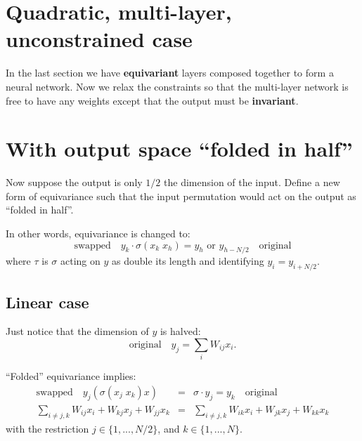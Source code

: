 \section{Quadratic, multi-layer, unconstrained case}

In the last section we have \textbf{equivariant} layers composed together to form a neural network.  Now we relax the constraints so that the multi-layer network is free to have any weights except that the output must be \textbf{invariant}.


\section{With output space ``folded in half''}

Now suppose the output is only $1/2$ the dimension of the input.  Define a new form of equivariance such that the input permutation would act on the output as ``folded in half''. 

In other words, equivariance is changed to:
\begin{equation}
\boxed{\mbox{swapped}} \quad y_k \cdot \sigma(x_k \; x_h) = y_h \mbox{  or  } y_{h-N/2} \quad \boxed{\mbox{original}} \end{equation}
where $\tau$ is $\sigma$ acting on $y$ as double its length and identifying $y_i = y_{i + N/2}$.

\subsection{Linear case}

Just notice that the dimension of $y$ is halved:
\begin{equation}
\boxed{\mbox{original}} \quad y_j = \sum_i W_{ij} x_i .
\end{equation}

``Folded'' equivariance implies:
\begin{eqnarray}
\boxed{\mbox{swapped}} \quad y_j ( \sigma(x_j \; x_k) x) %
&=& \sigma \cdot y_j = y_k \quad \boxed{\mbox{original}} \\
\sum_{i \neq j,k} W_{ij} x_i + W_{kj} x_j + W_{jj} x_k &=& \sum_{i \neq j,k} W_{ik} x_i + W_{jk} x_j + W_{kk} x_k  \nonumber
\end{eqnarray}
with the restriction $j \in \{ 1,..., N/2 \}$, and $k \in \{ 1,..., N \}$.


